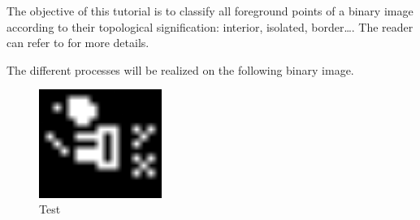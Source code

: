 \def\difficulty{1}

\begin{note}The objective of this tutorial is to classify all foreground points of a binary image according to their topological signification: interior, isolated, border\dots. The reader can refer to \cite{Couprie2012}for more details.\end{note}

\noindent The different processes will be realized on the following binary image.
\begin{figure}[H]
\caption{Test}
\centering\includegraphics[width=4cm]{test_topology.jpg}
\end{figure}


